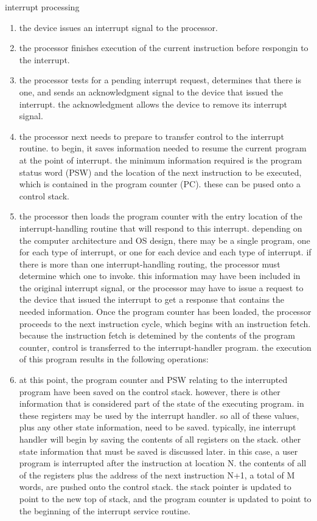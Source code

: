 \documentclass[parindent=0pt]{article}
\begin{document}
interrupt processing
	\begin{enumerate}
		\item the device issues an interrupt signal to the processor.
		\item the processor finishes execution of the current instruction before respongin to the interrupt.
		\item the processor tests for a pending interrupt request, determines that there is one, and sends an acknowledgment signal to the device that issued the interrupt. the acknowledgment allows the device to remove its interrupt signal.
		\item the processor next needs to prepare to transfer control to the interrupt routine. to begin, it saves information needed to resume the current program at the point of interrupt. the minimum information required is the program status word (PSW) and the location of the next instruction to be executed, which is contained in the program counter (PC). these can be pused onto a control stack.
		\item the processor then loads the program counter with the entry location of the interrupt-handling routine that will respond to this interrupt. depending on the computer architecture and OS design, there may be a single program, one for each type of interrupt, or one for each device and each type of interrupt. if there is more than one interrupt-handling routing, the processor must determine which one to invoke. this information may have been included in the original interrupt signal, or the processor may have to issue a request to the device that issued the interrupt to get a response that contains the needed information.
		Once the program counter has been loaded, the processor proceeds to the next instruction cycle, which begins with an instruction fetch. because the instruction fetch is detemined by the contents of the program counter, control is transferred to the interrupt-handler program. the execution of this program results in the following operations:

		\item at this point, the program counter and PSW relating to the interrupted program have been saved on the control stack. however, there is other information that is considered part of the state of the executing program. in these registers may be used by the interrupt handler. so all of these values, plus any other state information, need to be saved. typically, ine interrupt handler will begin by saving the contents of all registers on the stack. other state information that must be saved is discussed later. in this case, a user program is interrupted after the instruction at location N. the contents of all of the registers plus the address of the next instruction N+1, a total of M words, are pushed onto the control stack. the stack pointer is updated to point to the new top of stack, and the program counter is updated to point to the beginning of the interrupt service routine.
		

\end{enumerate}
\end{document}
